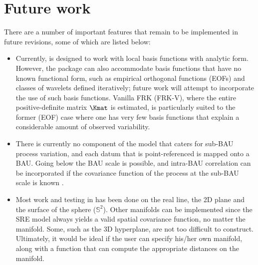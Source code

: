\section{Future work} \label{sec:future}

There are a number of important features that remain to be implemented in future revisions, some of which are listed below:
\begin{itemize}

\item Currently,  is designed to work with local basis functions with analytic form. However, the package can also accommodate basis functions that have no known functional form, such as empirical orthogonal functions (EOFs) and classes of wavelets defined iteratively; future work will attempt to incorporate the use of such basis functions. Vanilla FRK (FRK-V), where the entire positive-definite matrix $\Kmat$ is estimated, is particularly suited to the former (EOF) case where one has very few basis functions that explain a considerable amount of observed variability.

\item There is currently no component of the model that caters for sub-BAU process variation, and each datum that is point-referenced is mapped onto a BAU. Going below the BAU scale is possible, and intra-BAU correlation can be incorporated if the covariance function of the process at the sub-BAU scale is known \citep{Wikle_2005}.

\item Most work and testing in  has been done on the real line, the 2D plane and the surface of the sphere ($\mathbb{S}^2$). Other manifolds can be implemented since the SRE model always yields a valid spatial covariance function, no matter the manifold. Some, such as the 3D hyperplane, are not too difficult to construct. Ultimately, it would be ideal if the user can specify his/her own manifold, along with a function that can compute the appropriate distances on the manifold.


\end{itemize}
